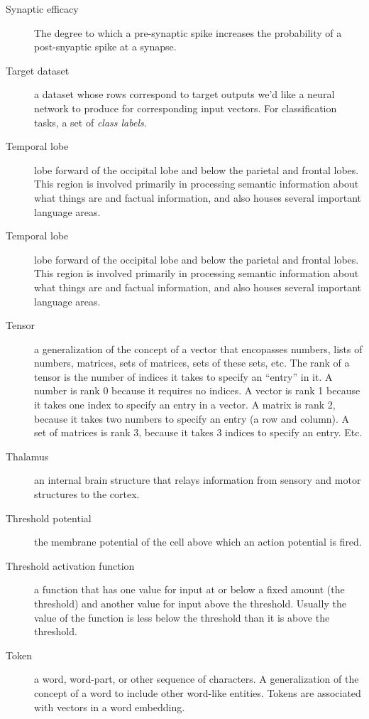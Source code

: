 \begin{description}
\item[Synaptic efficacy] The degree to which a pre-synaptic spike increases the probability of a post-snyaptic spike at a synapse.

\item[Target dataset] a dataset whose rows correspond to target outputs we'd like a neural network to produce for corresponding input vectors. For classification tasks, a set of \emph{class labels}.

\item[Temporal lobe] lobe forward of the occipital lobe and below the parietal and frontal lobes. This region is involved primarily in processing semantic information about what things are and factual information, and also houses several important language areas.

\item[Temporal lobe] lobe forward of the occipital lobe and below the parietal and frontal lobes. This region is involved primarily in processing semantic information about what things are and factual information, and also houses several important language areas.

\item[Tensor] a generalization of the concept of a vector that encopasses numbers, lists of numbers, matrices, sets of matrices, sets of these sets, etc. The rank of a  tensor is the number of indices it takes to specify an ``entry'' in it.  A number is rank 0 because it requires no indices. A vector is rank 1 because it takes one index to specify an entry in a vector. A matrix is rank 2, because it takes two numbers to specify an entry (a row and column). A set of matrices is rank 3, because it takes 3 indices to specify an entry. Etc.

\item[Thalamus] an internal brain structure that relays information from sensory and motor structures to the cortex.

\item[Threshold potential] the membrane potential of the cell above which an action potential is fired. 

\item[Threshold activation function] a function that has one value for  input at or below a fixed amount (the threshold) and another value for input above the threshold. Usually the value of the function is less below the  threshold than it is above the threshold.

\item[Token] a word, word-part, or other sequence of characters. A generalization of the concept of a word to include other word-like entities. Tokens are associated with vectors in a word embedding.


\end{description}
